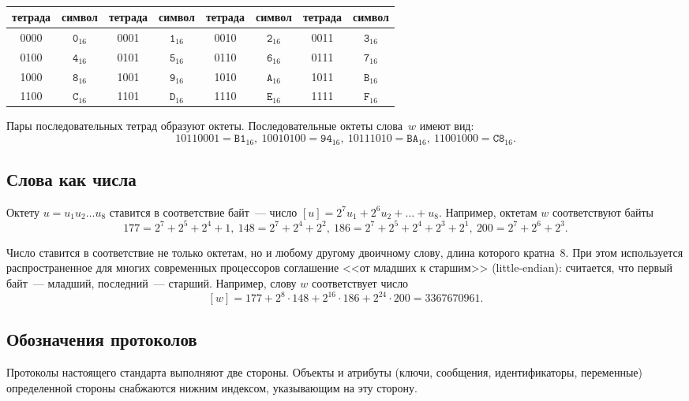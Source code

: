 \begin{table}[H]
\caption{}\label{Table.Hex}
\begin{tabular}{|c|c||c|c||c|c||c|c|}
\hline
тетрада & символ & тетрада & символ & тетрада & символ & тетрада & символ\\
\hline
\hline
0000 & $\texttt{0}_{16}$ & 0001 & $\texttt{1}_{16}$ & 
0010 & $\texttt{2}_{16}$ & 0011 & $\texttt{3}_{16}$\\
0100 & $\texttt{4}_{16}$ & 0101 & $\texttt{5}_{16}$ & 
0110 & $\texttt{6}_{16}$ & 0111 & $\texttt{7}_{16}$\\ 
1000 & $\texttt{8}_{16}$ & 1001 & $\texttt{9}_{16}$ & 
1010 & $\texttt{A}_{16}$ & 1011 & $\texttt{B}_{16}$\\ 
1100 & $\texttt{C}_{16}$ & 1101 & $\texttt{D}_{16}$ & 
1110 & $\texttt{E}_{16}$ & 1111 & $\texttt{F}_{16}$\\ 
\hline
\end{tabular}
\end{table}

Пары последовательных тетрад образуют октеты.
Последовательные октеты слова~$w$ имеют вид:
$$
1011 0001=\texttt{B1}_{16},\ 
1001 0100=\texttt{94}_{16},\ 
1011 1010=\texttt{BA}_{16},\  
1100 1000=\texttt{C8}_{16}.
$$

\subsection{Слова как числа}

Октету $u=u_1 u_2\ldots u_8$ ставится в соответствие байт~--- 
число $[u]=2^7u_1+2^6 u_2+\ldots + u_8$. 
Например, октетам $w$ соответствуют байты
$$
177=2^7+2^5+2^4+1,\ 
148=2^7+2^4+2^2,\ 
186=2^7+2^5+2^4+2^3+2^1,\ 
200=2^7+2^6+2^3.
$$

Число ставится в соответствие не только октетам, но и любому другому
двоичному слову, длина которого кратна~$8$. 
%
При этом используется распространенное для многих современных 
процессоров соглашение <<от младших к старшим>> (little-endian):
считается, что первый байт~--- младший, последний~--- старший.
Например, слову $w$ соответствует число
$$
[w]=177+2^{8}\cdot 148+2^{16}\cdot 186+2^{24}\cdot 200 = 3367670961.
$$

\subsection{Обозначения протоколов}

Протоколы настоящего стандарта выполняют две стороны.
Объекты и атрибуты (ключи, сообщения, идентификаторы, переменные)
определенной стороны снабжаются нижним индексом,
указывающим на эту сторону.


